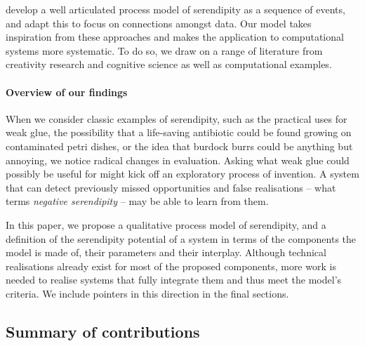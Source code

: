\citet{lawley2008maximising} develop a
well articulated process model of serendipity as a sequence of events,
and \citet{Makri2012a} adapt this to focus on connections amongst
data.  Our model takes inspiration from these
approaches and makes the application
to computational systems more systematic.  To do so, we draw
on a range of literature from creativity research
and cognitive science as well as computational examples.


\paragraph{Overview of our findings}
When we consider classic examples of serendipity, such as the
practical uses for weak glue, the possibility that a life-saving
antibiotic could be found growing on contaminated petri dishes, or the
idea that burdock burrs could be anything but annoying, we notice
radical changes in evaluation.   Asking what weak glue could possibly be useful for might kick
off an exploratory process of invention.  A system that can detect
previously missed opportunities and false realisations -- what
\citet[p.~639]{van1994anatomy} terms \emph{negative serendipity} --
may be able to learn from them.

In this paper, we propose a qualitative process model of serendipity, and a definition of the serendipity potential of a system in terms of the components the model is made of, their parameters and their interplay. 
Although technical realisations already exist for most of the proposed components, more work is needed to realise systems that fully integrate them and thus meet the model's
criteria.  We include pointers in this direction in the final
sections.

\subsection*{Summary of contributions} \label{sec:contributions}


